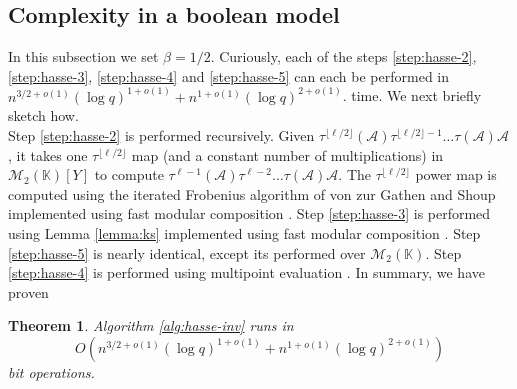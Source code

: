 \documentclass[12pt]{article}
\theoremstyle{plain}
\newtheorem{theorem}{Theorem}
\theoremstyle{definition}
\def\K{\ensuremath{\mathbb{K}}}
\begin{document}
\subsection{Complexity in a boolean model}

In this subsection we set $\beta = 1/2$. Curiously, each of the steps \ref{step:hasse-2}, 
\ref{step:hasse-3}, \ref{step:hasse-4} and \ref{step:hasse-5} can each be performed in 
$n^{3/2+o(1)} (\log q)^{1+o(1)} + n^{1+o(1)} (\log q)^{2+o(1)}$. time. We next briefly sketch 
how.\\ 
 
Step \ref{step:hasse-2} is performed recursively. Given 
$\tau^{\lfloor\ell/2\rfloor}(\mathcal{A})\tau^{\lfloor\ell/2\rfloor-1}\ldots\tau(\mathcal{A}) 
\mathcal{A}$, it takes one $\tau^{\lfloor\ell/2\rfloor}$ map (and a constant number of 
multiplications) in $\mathscr{M}_2(\K)[Y]$ to compute $\tau^{\ell-1}(\mathcal{A}) \tau^{\ell-2} 
\ldots \tau(\mathcal{A}) \mathcal{A}$. The $\tau^{\lfloor\ell/2\rfloor}$ power map is computed 
using the iterated Frobenius algorithm of von zur Gathen and Shoup \cite{gs} implemented using fast 
modular composition \cite{ku}. Step \ref{step:hasse-3} is performed using Lemma \ref{lemma:ks} 
implemented using fast modular composition \cite{ku}. Step \ref{step:hasse-5} is nearly identical, 
except its performed over $\mathscr{M}_2(\K)$. Step \ref{step:hasse-4} is performed using 
multipoint evaluation \cite{vzGG}. In summary, we have proven 
\begin{theorem}
	\label{theo:hasse-inv}
	Algorithm \ref{alg:hasse-inv} runs in 
	\[O(n^{3/2+o(1)} (\log q)^{1+o(1)} + n^{1+o(1)} (\log q)^{2+o(1)})\]
	bit operations.
\end{theorem}





\end{document}
